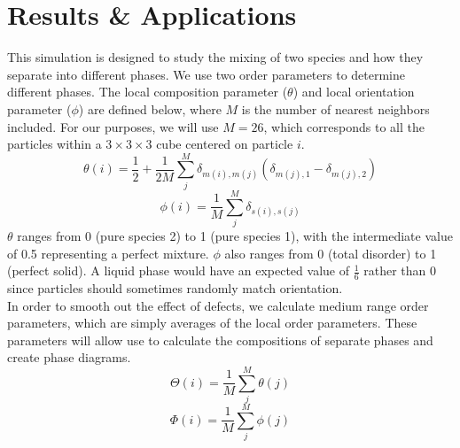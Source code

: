 \documentclass{article}
\begin{document}
\section*{Results \& Applications}
\vspace{-7pt}
\indent\indent This simulation is designed to study the mixing of two species and how they separate into different phases. We use two order parameters to determine different phases. The local composition parameter ($\theta$) and local orientation parameter ($\phi$) are defined below, where $M$ is the number of nearest neighbors included. For our purposes, we will use $M=26$, which corresponds to all the particles within a $3\times3\times3$ cube centered on particle $i$.
$$\theta(i) = \frac{1}{2} + \frac{1}{2M}\sum_j^M\delta_{m(i),m(j)}\left(\delta_{m(j),1}-\delta_{m(j),2}\right)$$
$$\phi(i) = \frac{1}{M}\sum_j^M\delta_{s(i),s(j)}$$
$\theta$ ranges from 0 (pure species 2) to 1 (pure species 1), with the intermediate value of 0.5 representing a perfect mixture. $\phi$ also ranges from 0 (total disorder) to 1 (perfect solid). A liquid phase would have an expected value of $\frac{1}{6}$ rather than 0 since particles should sometimes randomly match orientation.\\
\indent In order to smooth out the effect of defects, we calculate medium range order parameters, which are simply averages of the local order parameters. These parameters will allow use to calculate the compositions of separate phases and create phase diagrams.
$$\Theta(i) = \frac{1}{M}\sum_j^M\theta(j)$$
$$\Phi(i) = \frac{1}{M}\sum_j^M\phi(j)$$


\newpage
\end{document}
